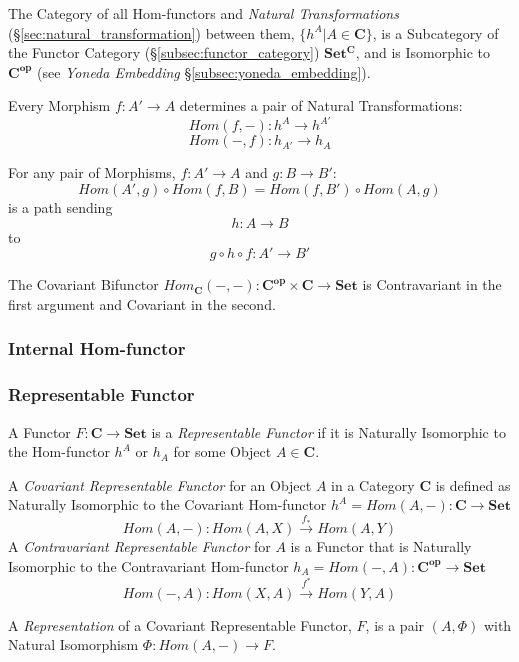 The Category of all Hom-functors and \emph{Natural Transformations}
(\S\ref{sec:natural_transformation}) between them, $\{ h^A | A \in
\mathbf{C} \}$, is a Subcategory of the Functor Category
(\S\ref{subsec:functor_category}) $\mathbf{Set^C}$, and is Isomorphic
to $\mathbf{C^{op}}$ (see \emph{Yoneda Embedding}
\S\ref{subsec:yoneda_embedding}).

Every Morphism $f : A' \rightarrow A$ determines a pair of Natural
Transformations:
\[
    Hom(f,-) : h^A \rightarrow h^{A'}
\]\[
    Hom(-,f) : h_{A'} \rightarrow h_A
\]

For any pair of Morphisms, $f : A' \rightarrow A$ and $g : B
\rightarrow B'$:
\[
    Hom(A',g) \circ Hom(f,B) = Hom(f,B') \circ Hom(A,g)
\]
is a path sending
\[
    h : A \rightarrow B
\]
to
\[
    g \circ h \circ f : A' \rightarrow B'
\]

The Covariant Bifunctor $Hom_{\mathbf{C}}(-,-) : \mathbf{C^{op}}
\times \mathbf{C} \rightarrow \mathbf{Set}$ is Contravariant in the
first argument and Covariant in the second.



\subsubsection{Internal Hom-functor}\label{subsec:internal_homfunctor}



\subsubsection{Representable Functor}\label{subsec:representable_functor}

A Functor $F : \mathbf{C} \rightarrow \mathbf{Set}$ is a
\emph{Representable Functor} if it is Naturally Isomorphic to the
Hom-functor $h^A$ or $h_A$ for some Object $A \in \mathbf{C}$.

A \emph{Covariant Representable Functor} for an Object $A$ in a
Category $\mathbf{C}$ is defined as Naturally Isomorphic to the
Covariant Hom-functor $h^A = Hom(A,-) : \mathbf{C} \rightarrow
\mathbf{Set}$
\[
    Hom(A,-) : Hom(A,X) \xrightarrow{f_*} Hom(A,Y)
\]
A \emph{Contravariant Representable Functor} for $A$ is a Functor that
is Naturally Isomorphic to the Contravariant Hom-functor $h_A =
Hom(-,A) : \mathbf{C^{op}} \rightarrow \mathbf{Set}$
\[
    Hom(-,A) : Hom(X,A) \xrightarrow{f^*} Hom(Y,A)
\]

A \emph{Representation} of a Covariant Representable Functor, $F$, is
a pair $(A, \Phi)$ with Natural Isomorphism $\Phi : Hom(A,-)
\rightarrow F$.



